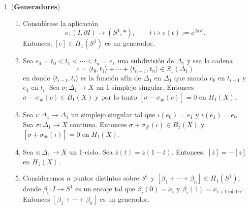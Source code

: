 \documentclass[11pt,a4paper]{article}
\theoremstyle{plain}
\theoremstyle{definition}
\theoremstyle{remark}
\begin{document}
\begin{enumerate}[label=\arabic*.,leftmargin=*]
\item (\textbf{Generadores})
\begin{enumerate}[label=\alph*)]
\item Considérese la aplicación
\[
e:(I,\partial I)\to(S^1,*), \qquad t\mapsto e(t):=e^{2\pi it}.
\]
Entonces, $[e]\in H_1(S^1)$ es un generador.
\item Sea $e_0=t_0<t_1<\cdots<t_n=e_1$ una subdivisión de $\Delta_1$ y sea
la cadena
\[
c=\langle t_0,t_1\rangle+\cdots+\langle t_{n-1},t_n\rangle\in S_1(\Delta_1)
\]
en donde $\langle t_{i-1},t_i\rangle$ es la función afín de $\Delta_1$ en
$\Delta_1$ que manda $e_0$ en $t_{i-1}$ y $e_1$ en $t_i$. Sea
$\sigma:\Delta_1\to X$ un $1$-simplejo singular. Entonces
$\sigma-\sigma_\#(c)\in B_1(X)$ y por lo tanto $[\sigma-\sigma_\#(c)]=0$ en
$H_1(X)$.
\item Sea $\iota:\Delta_1\to\Delta_1$ un simplejo singular tal que
$\iota(e_0)=e_1$ y $\iota(e_1)=e_0$. Sea $\sigma:\Delta_1\to X$ continua.
Entonces $\sigma+\sigma_\#(\iota)\in B_1(X)$ y $[\sigma+\sigma_\#(\iota)]=0$
en $H_1(X)$.
\item Sea $z:\Delta_1\to X$ un $1$-ciclo. Sea $\overline z(t)=z(1-t)$.
Entonces, $[\overline z]=-[z]$ en $H_1(X)$.
\item Consideremos $n$ puntos distintos sobre $S^1$ y
$[\beta_1+\cdots+\beta_n]\in H_1(S^1)$, donde $\beta_i:I\to S^1$ es un
encaje tal que $\beta_i(0)=x_i$ y $\beta_i(1)=x_{i+1\ \mathrm{m\acute od}\ n}$.
Entonces $[\beta_1+\cdots+\beta_n]$ es un generador.
\end{enumerate}


\end{enumerate}
\end{document}
